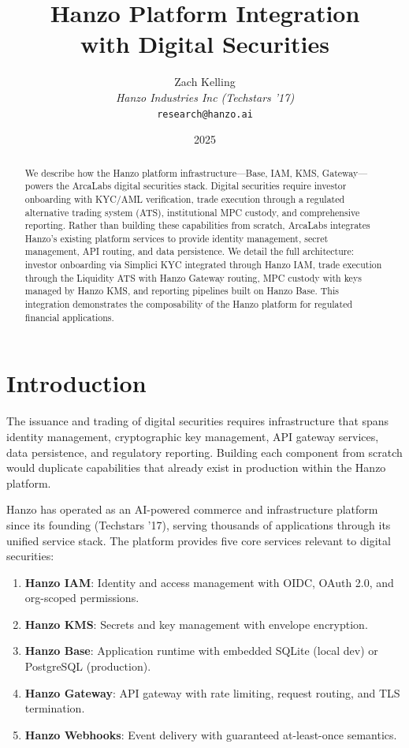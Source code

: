 \documentclass[11pt]{article}
\title{Hanzo Platform Integration\\[0.3em]
{\large with Digital Securities}}
\author{
    Zach Kelling \\
    \textit{Hanzo Industries Inc (Techstars '17)} \\
    \texttt{research@hanzo.ai}
}
\date{2025}
\begin{document}
\hanzocoverpage

\begin{abstract}
We describe how the Hanzo platform infrastructure---Base, IAM, KMS,
Gateway---powers the ArcaLabs digital securities stack. Digital securities
require investor onboarding with KYC/AML verification, trade execution
through a regulated alternative trading system (ATS), institutional MPC
custody, and comprehensive reporting. Rather than building these
capabilities from scratch, ArcaLabs integrates Hanzo's existing platform
services to provide identity management, secret management, API routing,
and data persistence. We detail the full architecture: investor
onboarding via Simplici KYC integrated through Hanzo IAM, trade execution
through the Liquidity ATS with Hanzo Gateway routing, MPC custody with
keys managed by Hanzo KMS, and reporting pipelines built on Hanzo Base.
This integration demonstrates the composability of the Hanzo platform for
regulated financial applications.
\end{abstract}

\section{Introduction}
\label{sec:intro}

The issuance and trading of digital securities requires infrastructure
that spans identity management, cryptographic key management, API
gateway services, data persistence, and regulatory reporting. Building
each component from scratch would duplicate capabilities that already
exist in production within the Hanzo platform.

Hanzo has operated as an AI-powered commerce and infrastructure platform
since its founding (Techstars '17), serving thousands of applications
through its unified service stack. The platform provides five core
services relevant to digital securities:

\begin{enumerate}[leftmargin=1.4em]
    \item \textbf{Hanzo IAM}: Identity and access management with OIDC,
    OAuth 2.0, and org-scoped permissions.
    \item \textbf{Hanzo KMS}: Secrets and key management with
    envelope encryption.
    \item \textbf{Hanzo Base}: Application runtime with embedded
    SQLite (local dev) or PostgreSQL (production).
    \item \textbf{Hanzo Gateway}: API gateway with rate limiting,
    request routing, and TLS termination.
    \item \textbf{Hanzo Webhooks}: Event delivery with guaranteed
    at-least-once semantics.
\end{enumerate}
\end{document}

